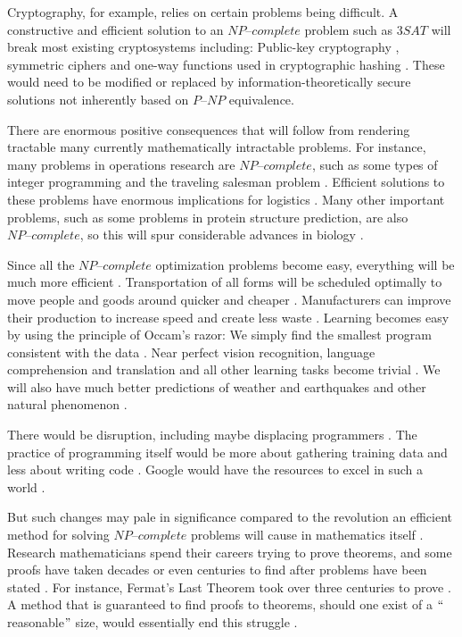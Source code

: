 \documentclass[a4paper,UKenglish,cleveref, autoref]{lipics-v2019}
\begin{document}
Cryptography, for example, relies on certain problems being difficult. A constructive and efficient solution to an $\textit{NP--complete}$ problem such as $3SAT$ will break most existing cryptosystems including: Public-key cryptography \cite{HW97}, symmetric ciphers \cite{MM00} and one-way functions used in cryptographic hashing \cite{DKV07}. These would need to be modified or replaced by information-theoretically secure solutions not inherently based on $\textit{P--NP}$ equivalence.

There are enormous positive consequences that will follow from rendering tractable many currently mathematically intractable problems. For instance, many problems in operations research are $\textit{NP--complete}$, such as some types of integer programming and the traveling salesman problem \cite{GJ79}. Efficient solutions to these problems have enormous implications for logistics \cite{CS00}. Many other important problems, such as some problems in protein structure prediction, are also $\textit{NP--complete}$, so this will spur considerable advances in biology \cite{BL98}.

Since all the $\textit{NP--complete}$ optimization problems become easy, everything will be much more efficient \cite{LF09}. Transportation of all forms will be scheduled optimally to move people and goods around quicker and cheaper \cite{LF09}. Manufacturers can improve their production to increase speed and create less waste \cite{LF09}. Learning becomes easy by using the principle of Occam's razor: We simply find the smallest program consistent with the data \cite{LF09}. Near perfect vision recognition, language comprehension and translation and all other learning tasks become trivial \cite{LF09}. We will also have much better predictions of weather and earthquakes and other natural phenomenon \cite{LF09}.

There would be disruption, including maybe displacing programmers \cite{IMP95}. The practice of programming itself would be more about gathering training data and less about writing code \cite{IMP95}. Google would have the resources to excel in such a world \cite{IMP95}.

But such changes may pale in significance compared to the revolution an efficient method for solving $\textit{NP--complete}$ problems will cause in mathematics itself \cite{CS00}. Research mathematicians spend their careers trying to prove theorems, and some proofs have taken decades or even centuries to find after problems have been stated \cite{AS17}. For instance, Fermat's Last Theorem took over three centuries to prove \cite{AS17}. A method that is guaranteed to find proofs to theorems, should one exist of a $``$reasonable$"$ size, would essentially end this struggle \cite{CS00}.


\end{document}
